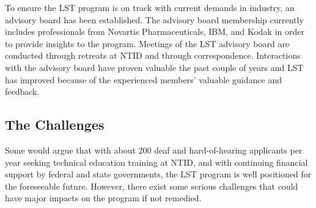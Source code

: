 \documentclass[11.5pt]{sig-alternate} %
\begin{document}
\begin{large}
\begin{enumerate}[label=\Alph*)]
\begin{enumerate}
        \begin{sloppypar}To ensure the LST program is on track with current demands in industry, an advisory board has been established. The advisory board membership currently includes professionals from Novartis Pharmaceuticals, IBM, and Kodak in order to provide insights to the program. Meetings of the LST advisory board are conducted through retreats at NTID and through correspondence. Interactions with the advisory board have proven valuable the past couple of years and LST has improved because of the experienced members’ valuable guidance and feedback.\end{sloppypar}
    \end{enumerate}
\end{enumerate}

\subsection*{The Challenges}
Some would argue that with about 200 deaf and hard-of-hearing applicants per year seeking technical education training at NTID, and with continuing financial support by federal and state governments, the LST program is well positioned for the foreseeable future. However, there exist some serious challenges that could have major impacts on the program if not remedied.


\end{large}
\end{document}
